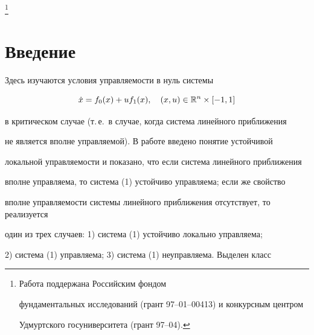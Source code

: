 \thanks{Работа поддержана Российским фондом


фундаментальных исследований (грант 97--01--00413) и конкурсным центром


Удмуртского госуниверситета (грант 97--04).}





\date{}




\pagestyle{plain} %







\maketitle


\label{begin}





\section*{Введение}





Здесь изучаются условия управляемости в нуль системы


\begin{equation}


\Dot x = f_0(x) + uf_1(x),\quad (x,u)\in \R^n\times[-1,1]


\end{equation}


в критическом случае (т.\,е.~в случае, когда система линейного приближения


не является вполне управляемой). В работе введено понятие устойчивой


локальной управляемости и показано, что если система линейного приближения


вполне управляема, то система (1) устойчиво управляема; если же свойство


вполне управляемости системы линейного приближения отсутствует, то реализуется


один из трех случаев: 1) система (1) устойчиво локально управляема;


2) система (1) управляема; 3) система (1) неуправляема. Выделен класс


